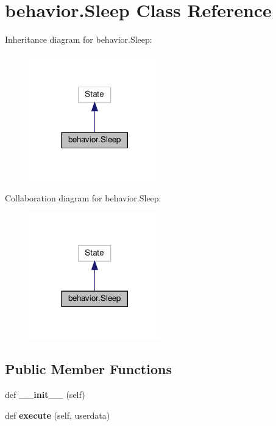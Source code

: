 \hypertarget{classbehavior_1_1Sleep}{}\section{behavior.\+Sleep Class Reference}
\label{classbehavior_1_1Sleep}


Inheritance diagram for behavior.\+Sleep\+:
\nopagebreak
\begin{figure}[H]
\begin{center}
\leavevmode
\includegraphics[width=161pt]{classbehavior_1_1Sleep__inherit__graph}
\end{center}
\end{figure}


Collaboration diagram for behavior.\+Sleep\+:
\nopagebreak
\begin{figure}[H]
\begin{center}
\leavevmode
\includegraphics[width=161pt]{classbehavior_1_1Sleep__coll__graph}
\end{center}
\end{figure}
\subsection*{Public Member Functions}
\begin{DoxyCompactItemize}
\item 
\mbox{\label{classbehavior_1_1Sleep_aa556edca2288130cc951b50a6ee7ada4}} 
def {\bfseries \+\_\+\+\_\+init\+\_\+\+\_\+} (self)
\item 
\mbox{\label{classbehavior_1_1Sleep_aa226487af5b2f8c797d859a2ee4b4d2e}} 
def {\bfseries execute} (self, userdata)
\end{DoxyCompactItemize}


